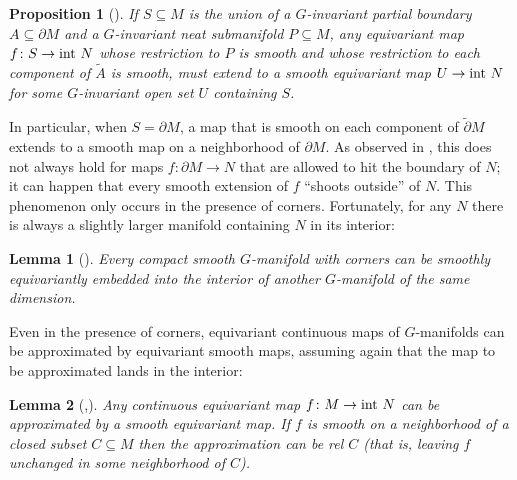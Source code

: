 \documentclass[11pt]{amsart}
\newtheorem{prop}{Proposition}[section]
\newtheorem{lem}{Lemma}[section]
\theoremstyle{definition}
\numberwithin{equation}{section}
\numberwithin{figure}{section}
\newcommand{\id}{\textup{id}}
\newcommand{\ti}{\widetilde}
\begin{document}
\begin{prop}[{\cite[Cor 2.32]{GIMM1}}]\label{smooth_extension}
	If $S \subseteq M$ is the union of a $G$-invariant partial boundary $A \subseteq \partial M$ and a $G$-invariant neat submanifold $P \subseteq M$, any equivariant map $f\colon S \to \textup{int }N$ whose restriction to $P$ is smooth and whose restriction to each component of $\ti A$ is smooth, must extend to a smooth equivariant map $U \to \textup{int }N$ for some $G$-invariant open set $U$ containing $S$.
\end{prop}

In particular, when $S = \partial M$, a map that is smooth on each component of $\ti\partial M$ extends to a smooth map on a neighborhood of $\partial M$. As observed in \cite[Rem 2.10]{GIMM1}, this does not always hold for maps $f\colon \partial M \to N$ that are allowed to hit the boundary of $N$; it can happen that every smooth extension of $f$ ``shoots outside'' of $N$. This phenomenon only occurs in the presence of corners. %
Fortunately, for any $N$ there is always a slightly larger manifold containing $N$ in its interior:


\begin{lem}[{\cite[Cor 2.47]{GIMM1}}]\label{extend_to_open_manifold}
	Every compact smooth $G$-manifold with corners can be smoothly equivariantly embedded into the interior of another $G$-manifold of the same dimension.
\end{lem}

Even in the presence of corners, equivariant continuous maps of $G$-manifolds can be approximated by equivariant smooth maps, assuming again that the map to be approximated lands in the interior:

\begin{lem}[{\cite[Cor 1.12]{wasserman},\cite[Lem 2.28]{GIMM1}}]\label{smooth_approximation}
	Any continuous equivariant map $f\colon M \to \textup{int } N$ can be approximated by a smooth equivariant map. If $f$ is smooth on a neighborhood of a closed subset $C \subseteq M$ then the approximation can be rel $C$ (that is, leaving $f$ unchanged in some neighborhood of $C$).
\end{lem}
\end{document}
